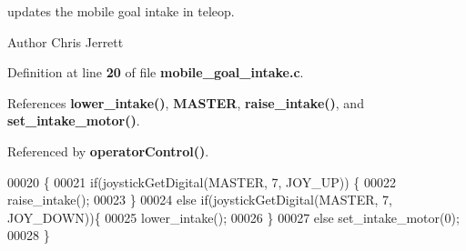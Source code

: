 updates the mobile goal intake in teleop. 

\begin{DoxyAuthor}{Author}
Chris Jerrett 
\end{DoxyAuthor}


Definition at line \textbf{ 20} of file \textbf{ mobile\+\_\+goal\+\_\+intake.\+c}.



References \textbf{ lower\+\_\+intake()}, \textbf{ M\+A\+S\+T\+ER}, \textbf{ raise\+\_\+intake()}, and \textbf{ set\+\_\+intake\+\_\+motor()}.



Referenced by \textbf{ operator\+Control()}.


\begin{DoxyCode}
00020                      \{
00021   \textcolor{keywordflow}{if}(joystickGetDigital(MASTER, 7, JOY\_UP)) \{
00022     raise_intake();
00023   \}
00024   \textcolor{keywordflow}{else} \textcolor{keywordflow}{if}(joystickGetDigital(MASTER, 7, JOY\_DOWN))\{
00025     lower_intake();
00026   \}
00027   \textcolor{keywordflow}{else} set_intake_motor(0);
00028 \}
\end{DoxyCode}
